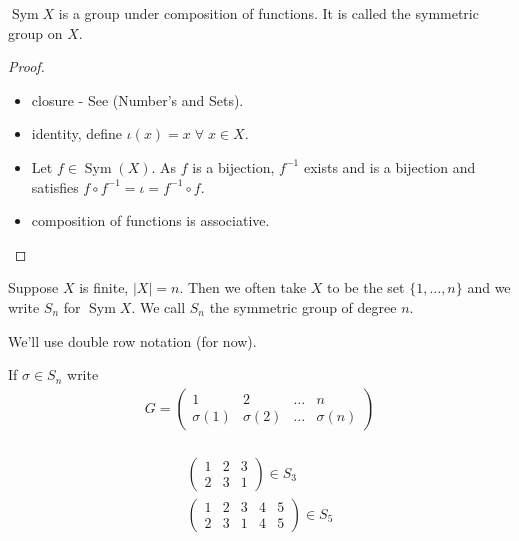 \begin{proposition}
\(\operatorname{Sym} X\) is a group under composition of functions. It is called the symmetric group on \(X\).
\end{proposition}

\begin{proof} \mbox{}
\begin{itemize}
\item
  closure - See  (Number's and Sets).
\item
  identity, define \(\iota (x) = x \; \forall \; x \in X\).
\item
  Let \(f \in \operatorname{Sym}(X)\).
  As \(f\) is a bijection, \(f^{-1}\) exists and is a bijection and satisfies \(f \circ f^{-1} = \iota = f^{-1} \circ f\).
\item
  composition of functions is associative.
\end{itemize}
\end{proof}

\begin{notation}
Suppose \(X\) is finite, \(|X| = n\).
Then we often take \(X\) to be the set \(\{ 1, \ldots, n \}\) and we write \(S_n\) for \(\operatorname{Sym} X\).
We call \(S_n\) the symmetric group of degree \(n\).
\end{notation}

\begin{notation}
We'll use double row notation (for now).

If \(\sigma \in S_n\) write
\begin{align*}
  G = \begin{pmatrix}
  1 & 2 & \ldots & n \\
  \sigma(1) & \sigma(2) & \ldots & \sigma(n)
  \end{pmatrix} \\
\end{align*}
\end{notation} 

\begin{example}
  \begin{align*}
    \begin{pmatrix}
    1 & 2 & 3 \\
    2 & 3 & 1
    \end{pmatrix} \in S_3 \\
    \begin{pmatrix}
    1 & 2 & 3 & 4 & 5 \\
    2 & 3 & 1 & 4 & 5
    \end{pmatrix} \in S_5
\end{align*}
\end{example} 

